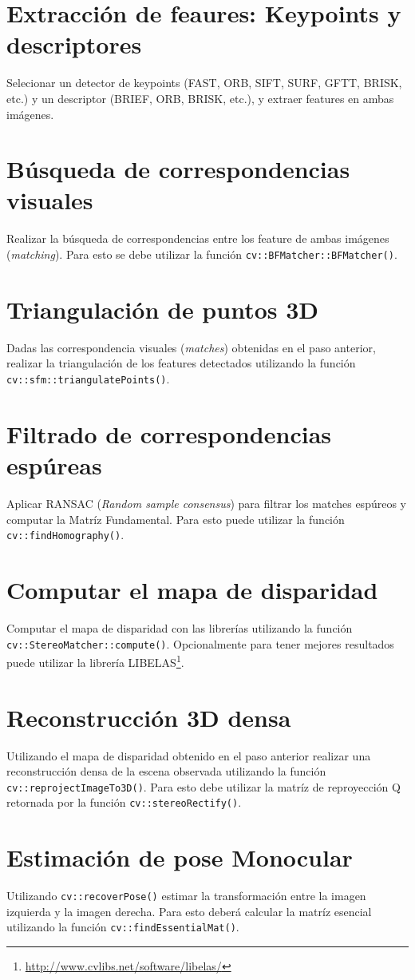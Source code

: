\documentclass[tp]{lcc}
\begin{document}
\section{Extracción de feaures: Keypoints y descriptores}
Selecionar un detector de keypoints (FAST, ORB, SIFT, SURF, GFTT, BRISK, etc.) y un descriptor (BRIEF, ORB, BRISK, etc.), y extraer features en ambas imágenes.

\section{Búsqueda de correspondencias visuales}
Realizar la búsqueda de correspondencias entre los feature de ambas imágenes (\emph{matching}). Para esto se debe utilizar la función \lstinline{cv::BFMatcher::BFMatcher()}. 

\section{Triangulación de puntos 3D}
Dadas las correspondencia visuales (\emph{matches}) obtenidas en el paso anterior, realizar la triangulación de los features detectados utilizando la función \lstinline{cv::sfm::triangulatePoints()}.

\section{Filtrado de correspondencias espúreas}
Aplicar RANSAC (\emph{Random sample consensus}) para filtrar los matches espúreos y computar la Matríz Fundamental. Para esto puede utilizar la función \lstinline{cv::findHomography()}.

\section{Computar el mapa de disparidad}
Computar el mapa de disparidad con las librerías utilizando la función \lstinline{cv::StereoMatcher::compute()}. Opcionalmente para tener mejores resultados puede utilizar la librería LIBELAS\footnote{\url{http://www.cvlibs.net/software/libelas/}}.

\section{Reconstrucción 3D densa}
Utilizando el mapa de disparidad obtenido en el paso anterior realizar una reconstrucción densa de la escena observada utilizando la función \lstinline{cv::reprojectImageTo3D()}. Para esto debe utilizar la matríz de reproyección Q retornada por la función \lstinline{cv::stereoRectify()}.

\section{Estimación de pose Monocular}
Utilizando \lstinline{cv::recoverPose()} estimar la transformación entre la imagen izquierda y la imagen derecha. Para esto deberá calcular la matríz esencial utilizando la función \lstinline{cv::findEssentialMat()}.
\end{document}
